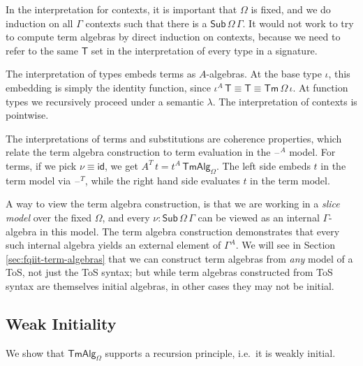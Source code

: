 \documentclass[12pt,a4paper,twoside,openany]{book}
\theoremstyle{remark}
\theoremstyle{definition}
\newcommand{\ms}[1]{\mathsf{#1}}
\newcommand{\id}{\mathsf{id}}
\newcommand{\Sub}{\mathsf{Sub}}
\newcommand{\Tm}{\mathsf{Tm}}
\newcommand{\blank}{\mathord{\hspace{1pt}\text{--}\hspace{1pt}}}
\newcommand{\TmAlg}{\ms{TmAlg}}
\begin{document}
In the interpretation for contexts, it is important that $\Omega$ is
fixed, and we do induction on all $\Gamma$ contexts such that there is a
$\Sub\,\Omega\,\Gamma$. It would not work to try to compute term algebras by
direct induction on contexts, because we need to refer to the same $\ms{T}$ set
in the interpretation of every type in a signature.

The interpretation of types embeds terms as $A$-algebras. At the base type
$\iota$, this embedding is simply the identity function, since $\iota^A\,\ms{T}
\equiv \ms{T} \equiv \Tm\,\Omega\,\iota$. At function types we recursively proceed
under a semantic $\lambda$. The interpretation of contexts is pointwise.

The interpretations of terms and substitutions are coherence properties, which
relate the term algebra construction to term evaluation in the $\blank^A$ model.
For terms, if we pick $\nu \equiv \id$, we get $A^T\,t =
t^A\,\TmAlg_{\Omega}$. The left side embeds $t$ in the term model via
$\blank^T$, while the right hand side evaluates $t$ in the term model.

A way to view the term algebra construction, is that we are working in a
\emph{slice model} over the fixed $\Omega$, and every $\nu :
\Sub\,\Omega\,\Gamma$ can be viewed as an internal $\Gamma$-algebra in this
model. The term algebra construction demonstrates that
every such internal algebra yields an external element of $\Gamma^A$. We will
see in Section \ref{sec:fqiit-term-algebras} that we can construct term algebras
from \emph{any} model of a ToS, not just the ToS syntax; but while term algebras
constructed from ToS syntax are themselves initial algebras, in other cases they
may not be initial.

\subsection{Weak Initiality}
We show that $\TmAlg_{\Omega}$ supports a recursion principle, i.e.\ it is weakly
initial.
\end{document}
